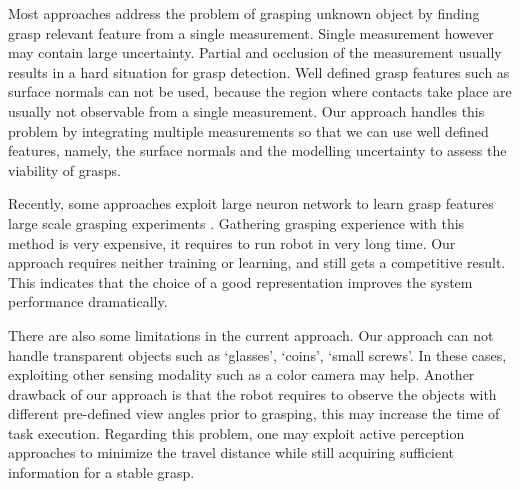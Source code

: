 Most approaches address the problem of grasping unknown object by finding grasp relevant feature from a single measurement. Single measurement however may contain large uncertainty. Partial and occlusion of the measurement usually results in a hard situation for grasp detection. Well defined grasp features such as surface normals can not be used, because the region where contacts take place are usually not observable from a single measurement. Our approach handles this problem by integrating multiple measurements so that we can use well defined features, namely, the surface normals and the modelling uncertainty to assess the viability of grasps. 

Recently, some approaches exploit large neuron network to learn grasp features large scale grasping experiments \cite{pinto2015supersizing}. Gathering grasping experience with this method is very expensive, it requires to run robot in very long time. Our approach requires neither training or learning, and still gets a competitive result. This indicates that the choice of a good representation improves the system performance dramatically. 

There are also some limitations in the current approach. Our approach can not handle transparent objects such as `glasses', `coins', `small screws'. In these cases, exploiting other sensing modality such as a color camera may help. Another drawback of our approach is that the robot requires to observe the objects with different pre-defined view angles prior to grasping, this may increase the time of task execution. Regarding this problem, one may exploit active perception approaches to minimize the travel distance while still acquiring sufficient information for a stable grasp. 

